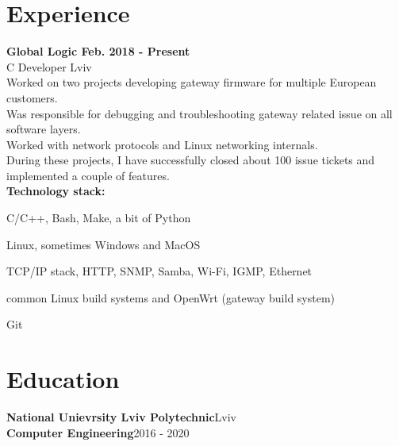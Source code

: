\documentclass{article}
\begin{document}
\section{Experience}
{\bfseries
Global Logic \hspace*{\fill}Feb. 2018 - Present\\
}
\vspace{0.5em}
C Developer  \hspace*{\fill}Lviv\\
Worked on two projects developing gateway firmware for multiple European customers.\\
Was responsible for debugging and troubleshooting gateway related issue on all software layers.\\
Worked with network protocols and Linux networking internals.\\
During these projects, I have successfully closed about 100 issue tickets and implemented a couple of features.\\

\textbf{Technology stack:}
\begin{description}[align=left,leftmargin=3.8cm,style=multiline,font=\normalfont]
\item[Languages:] C/C++, Bash, Make, a bit of Python
\item[Operating Systems:] Linux, sometimes Windows and MacOS
\item[Networking:] TCP/IP stack, HTTP, SNMP, Samba, Wi-Fi, IGMP, Ethernet
\item[Build systems:] common Linux build systems and OpenWrt (gateway build system)
\item[VCS:] Git\\
\end{description}

\section{Education}
\textbf{National Unievrsity Lviv Polytechnic}\hspace*{\fill}Lviv\\
\textbf{Computer Engineering}\hspace*{\fill}2016 - 2020
\end{document}
